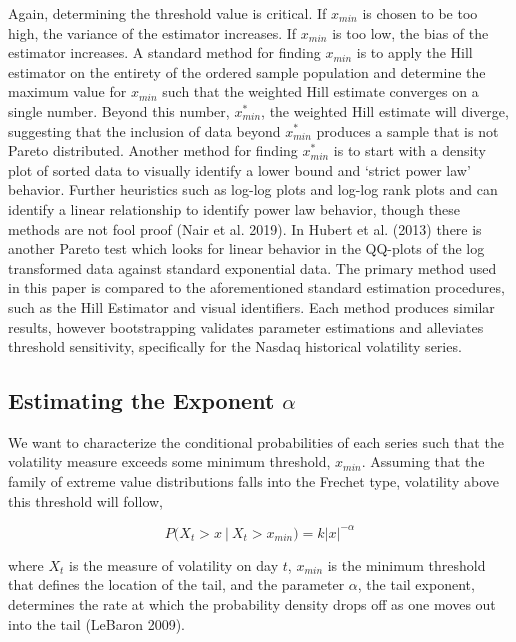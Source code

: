\documentclass[11pt,a4paper,oldfontcommands]{memoir}
\begin{document}
{Again, determining the threshold value is critical. If $x_{min}$ is chosen to be too high, the variance of the estimator increases. If $x_{min}$ is too low, the bias of the estimator increases. A standard method for finding $x_{min}$ is to apply the Hill estimator on the entirety of the ordered sample population and determine the maximum value for $x_{min}$ such that the weighted Hill estimate converges on a single number. Beyond this number, $x_{min}^\ast$, the weighted Hill estimate will diverge, suggesting that the inclusion of data beyond $x_{min}^\ast$ produces a sample that is not Pareto distributed. Another method for finding $x_{min}^\ast$ is to start with a density plot of sorted data to visually identify a lower bound and ‘strict power law’ behavior. Further heuristics such as log-log plots and log-log rank plots and can identify a linear relationship to identify power law behavior, though these methods are not fool proof (Nair et al. 2019). In Hubert et al. (2013) there is another Pareto test which looks for linear behavior in the QQ-plots of the log transformed data against standard exponential data. The primary method used in this paper is compared to the aforementioned standard estimation procedures, such as the Hill Estimator and visual identifiers. Each method produces similar results, however bootstrapping validates parameter estimations and alleviates threshold sensitivity, specifically for the Nasdaq historical volatility series. 


\subsection{Estimating the Exponent $\alpha$}
   
We want to characterize the conditional probabilities of each series such that the volatility measure exceeds some minimum threshold, $x_{min}$. Assuming that the family of extreme value distributions falls into the Frechet type, volatility above this threshold will follow,

$$
P(X_t > x \ | \ X_t > x_{min}) = k|x|^{-\alpha}
$$

\begin{flushleft}

where $X_t$ is the measure of volatility on day $t$, $x_{min}$ is the minimum threshold that defines the location of the tail, and the parameter $\alpha$, the tail exponent, determines the rate at which the probability density drops off as one moves out into the tail (LeBaron 2009). 
\end{flushleft}


}
\end{document}
